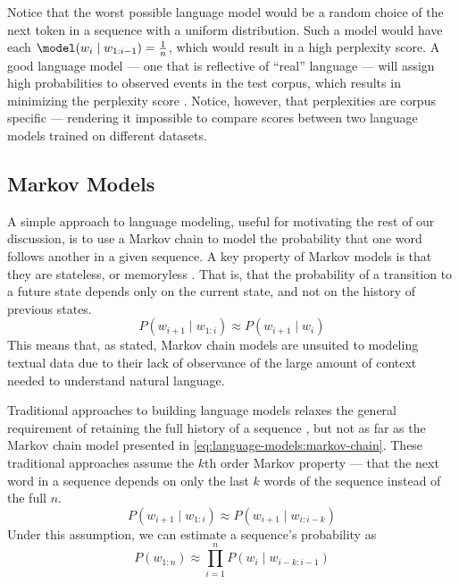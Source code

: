 Notice that the worst possible language model would be a random choice of the next token in a sequence with a uniform distribution.
Such a model would have each $\model(w_i \mid w_{1:i-1}) = \frac{1}{n}$, which would result in a high perplexity score.
A good language model --- one that is reflective of ``real'' language --- will assign high probabilities to observed events in the test corpus, which results in minimizing the perplexity score \cite{goldberg_2017}.
Notice, however, that perplexities are corpus specific --- rendering it impossible to compare scores between two language models trained on different datasets.

\subsection{Markov Models}\label{sec:language-models:markov}

A simple approach to language modeling, useful for motivating the rest of our discussion, is to use a Markov chain to model the probability that one word follows another in a given sequence.
A key property of Markov models is that they are stateless, or memoryless \cite{gagniuc_2017}.
That is, that the probability of a transition to a future state depends only on the current state, and not on the history of previous states.
\begin{equation}
    P(w_{i + 1} \mid w_{1:i}) \approx P(w_{i+1} \mid w_i) \label{eq:language-models:markov-chain}
\end{equation}
This means that, as stated, Markov chain models are unsuited to modeling textual data due to their lack of observance of the large amount of context needed to understand natural language.

Traditional approaches to building language models relaxes the general requirement of retaining the full history of a sequence \cite{mikolov2012statistical}, but not as far as the Markov chain model presented in \autoref{eq:language-models:markov-chain}.
These traditional approaches assume the $k$th order Markov property \cite{goldberg_2017} --- that the next word in a sequence depends on only the last $k$ words of the sequence instead of the full $n$.
\begin{equation}
    P(w_{i+1} \mid w_{1:i}) \approx P(w_{i+1} \mid w_{i:i-k}) \label{eq:language-models:k-order-markov}
\end{equation}
Under this assumption, we can estimate a sequence's probability as
\begin{equation}
    P(w_{1:n}) \approx \prod_{i=1}^n P(w_i \mid w_{i-k:i-1}) \label{eq:language-models:k-order-sequence-probability}
\end{equation}

